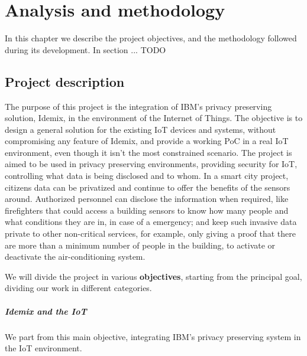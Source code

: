 \chapter{Analysis and methodology}\label{ch:objectives}





In this chapter we describe the project objectives, and the methodology followed during its development. In section ... TODO

\section{Project description}

The purpose of this project is the integration of IBM's privacy preserving solution, Idemix, in the environment of the Internet of Things. The objective is to design a general solution for the existing IoT devices and systems, without compromising any feature of Idemix, and provide a working PoC in a real IoT environment, even though it isn't the most constrained scenario. The project is aimed to be used in privacy preserving environments, providing security for IoT, controlling what data is being disclosed and to whom. In a smart city project, citizens data can be privatized and continue to offer the benefits of the sensors around. Authorized personnel can disclose the information when required, like firefighters that could access a building sensors to know how many people and what conditions they are in, in case of a emergency; and keep such invasive data private to other non-critical services, for example, only giving a proof that there are more than a minimum number of people in the building, to activate or deactivate the air-conditioning system.

\hfil

We will divide the project in various \textbf{objectives}, starting from the principal goal, dividing our work in different categories.

\hfil

\paragraph{Idemix and the IoT}
We part from this main objective, integrating IBM's privacy preserving system in the IoT environment. 


